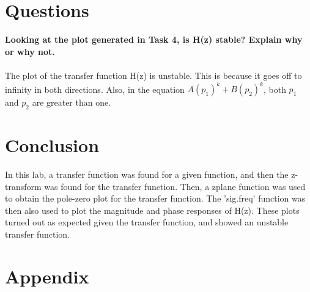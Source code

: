 \documentclass[12pt]{report}
\begin{document}
\section{Questions}

\textbf{Looking at the plot generated in Task 4, is H(z) stable? Explain why or why not.}
\\
\\The plot of the transfer function H(z) is unstable. This is because it goes off to infinity in both directions. Also, in the equation $A(p_1)^k + B(p_2)^k$, both $p_1$ and $p_2$ are greater than one.

\section{Conclusion}
In this lab, a transfer function was found for a given function, and then the z-transform was found for the transfer function. Then, a zplane function was used to obtain the pole-zero plot for the transfer function. The 'sig.freq' function was then also used to plot the magnitude and phase responses of H(z). These plots turned out as expected given the transfer function, and showed an unstable transfer function.

\section{Appendix}
\end{document}

